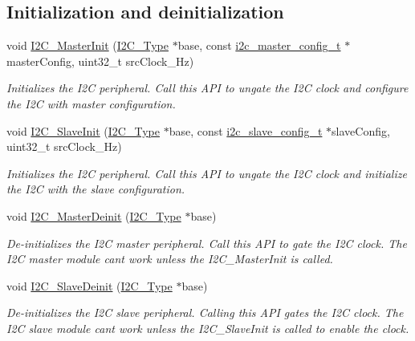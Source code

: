 \subsection*{Initialization and deinitialization}
\begin{DoxyCompactItemize}
\item 
void \mbox{\hyperlink{group__i2c__driver_ga29f967b3ae8487a36ba2a58deb01ccae}{I2\+C\+\_\+\+Master\+Init}} (\mbox{\hyperlink{struct_i2_c___type}{I2\+C\+\_\+\+Type}} $\ast$base, const \mbox{\hyperlink{group__i2c__driver_gad739710b6b65e12ca5ba9dc2a2a2b463}{i2c\+\_\+master\+\_\+config\+\_\+t}} $\ast$master\+Config, uint32\+\_\+t src\+Clock\+\_\+\+Hz)
\begin{DoxyCompactList}\small\item\em Initializes the I2C peripheral. Call this A\+PI to ungate the I2C clock and configure the I2C with master configuration. \end{DoxyCompactList}\item 
void \mbox{\hyperlink{group__i2c__driver_gaf2397a88554ea896f212dd262f9bc731}{I2\+C\+\_\+\+Slave\+Init}} (\mbox{\hyperlink{struct_i2_c___type}{I2\+C\+\_\+\+Type}} $\ast$base, const \mbox{\hyperlink{group__i2c__driver_gaa70dd0ec9815617269569190efd2de5d}{i2c\+\_\+slave\+\_\+config\+\_\+t}} $\ast$slave\+Config, uint32\+\_\+t src\+Clock\+\_\+\+Hz)
\begin{DoxyCompactList}\small\item\em Initializes the I2C peripheral. Call this A\+PI to ungate the I2C clock and initialize the I2C with the slave configuration. \end{DoxyCompactList}\item 
void \mbox{\hyperlink{group__i2c__driver_gadcf7122f0a38d4d9da0f052fcb167957}{I2\+C\+\_\+\+Master\+Deinit}} (\mbox{\hyperlink{struct_i2_c___type}{I2\+C\+\_\+\+Type}} $\ast$base)
\begin{DoxyCompactList}\small\item\em De-\/initializes the I2C master peripheral. Call this A\+PI to gate the I2C clock. The I2C master module can\textquotesingle{}t work unless the I2\+C\+\_\+\+Master\+Init is called. \end{DoxyCompactList}\item 
void \mbox{\hyperlink{group__i2c__driver_gadb50014db29dd75ea2001fb7bc837e77}{I2\+C\+\_\+\+Slave\+Deinit}} (\mbox{\hyperlink{struct_i2_c___type}{I2\+C\+\_\+\+Type}} $\ast$base)
\begin{DoxyCompactList}\small\item\em De-\/initializes the I2C slave peripheral. Calling this A\+PI gates the I2C clock. The I2C slave module can\textquotesingle{}t work unless the I2\+C\+\_\+\+Slave\+Init is called to enable the clock. \end{DoxyCompactList}\item 

\end{DoxyCompactItemize}
